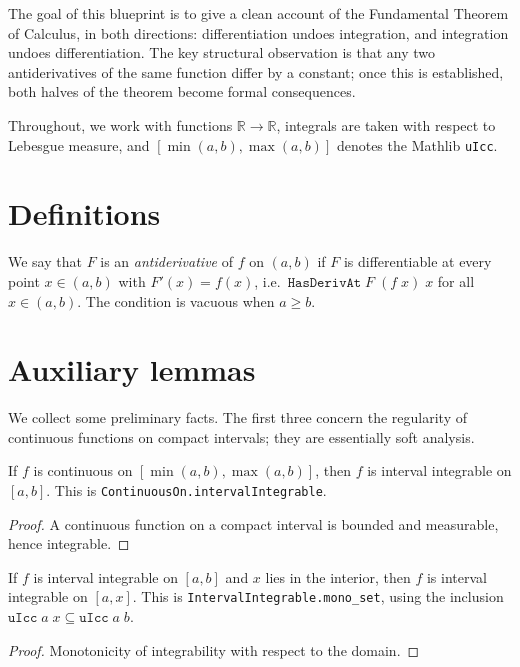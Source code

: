

The goal of this blueprint is to give a clean account of the Fundamental Theorem of Calculus, in both directions: differentiation undoes integration, and integration undoes differentiation. The key structural observation is that any two antiderivatives of the same function differ by a constant; once this is established, both halves of the theorem become formal consequences.

Throughout, we work with functions $\mathbb{R} \to \mathbb{R}$, integrals are taken with respect to Lebesgue measure, and $[\min(a,b), \max(a,b)]$ denotes the Mathlib \texttt{uIcc}.

\section{Definitions}

\begin{definition}[Antiderivative]
    \label{def:antiderivative}

    We say that $F$ is an \emph{antiderivative} of $f$ on $(a,b)$ if $F$ is differentiable at every point $x \in (a,b)$ with $F'(x) = f(x)$, i.e.\ $\texttt{HasDerivAt}\; F\; (f\; x)\; x$ for all $x \in (a,b)$. The condition is vacuous when $a \ge b$.
\end{definition}

\section{Auxiliary lemmas}

We collect some preliminary facts. The first three concern the regularity of continuous functions on compact intervals; they are essentially soft analysis.

\begin{lemma}
    \label{lem:continuous_interval_integrable}

    If $f$ is continuous on $[\min(a,b), \max(a,b)]$, then $f$ is interval integrable on $[a,b]$. This is \texttt{ContinuousOn.intervalIntegrable}.
\end{lemma}
\begin{proof}
    A continuous function on a compact interval is bounded and measurable, hence integrable.
\end{proof}






\begin{lemma}
    \label{lem:interval_integrable_restriction}

    If $f$ is interval integrable on $[a,b]$ and $x$ lies in the interior, then $f$ is interval integrable on $[a,x]$. This is \texttt{IntervalIntegrable.mono\_set}, using the inclusion $\texttt{uIcc}\; a\; x \subseteq \texttt{uIcc}\; a\; b$.
\end{lemma}
\begin{proof}
    Monotonicity of integrability with respect to the domain.
\end{proof}

